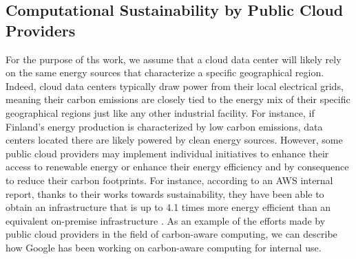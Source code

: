 
\subsection{Computational Sustainability by Public Cloud Providers}

For the purpose of ths work, we assume that a cloud data center will likely rely on the same energy sources that characterize a specific geographical region.
Indeed, cloud data centers typically draw power from their local electrical grids, meaning their carbon emissions are closely tied to the energy mix of their specific geographical regions just like any other industrial facility.
For instance, if Finland's energy production is characterized by low carbon emissions, data centers located there are likely powered by clean energy sources. 
However, some public cloud providers may implement individual initiatives to enhance their access to renewable energy or enhance their energy efficiency and by consequence to reduce their carbon footprints.
For instance, according to an AWS internal report, thanks to their works towards sustainability, they have been able to obtain an infrastructure that is up to 4.1 times more energy efficient than an equivalent on-premise infrastructure \cite{aws_sustainability}.
As an example of the efforts made by public cloud providers in the field of carbon-aware computing, we can describe how Google has been working on carbon-aware computing for internal use. 

